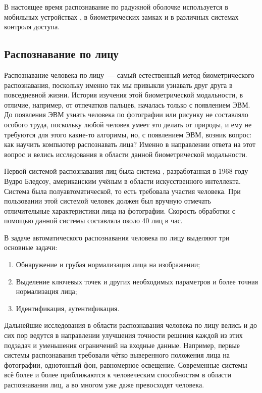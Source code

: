 \documentclass[14pt, a4paper]{extarticle}
\begin{document}
В настоящее время распознавание по радужной оболочке используется в мобильных устройствах \cite{odinokikh2018high}, в биометрических замках и в различных системах контроля доступа.

\subsection{Распознавание по лицу}
Распознавание человека по лицу~--- самый естественный метод биометрического распознавания, поскольку именно так мы привыкли узнавать друг друга в повседневной жизни. История изучения этой биометрической модальности, в отличие, например, от отпечатков пальцев, началась только с появлением ЭВМ. До появления ЭВМ узнать человека по фотографии или рисунку не составляло особого труда, поскольку любой человек умеет это делать от природы, и ему не требуются для этого какие-то алгоримы, но, с появлением ЭВМ, возник вопрос: как научить компьютер распознавать лица? Именно в направлении ответа на этот вопрос и велись исследования в области данной биометрической модальности.

Первой системой распознавания лиц была система \cite{bledsoe1968face}, разработанная в 1968 году Вудро Бледсоу, американским учёным в области искусственного интеллекта. Система была полуавтоматической, то есть требовала участия человека. При пользовании этой системой человек должен был вручную отмечать отличительные характеристики лица на фотографии. Скорость обработки с помощью данной системы составляла около 40 лиц в час.

В задаче автоматического распознавания человека по лицу выделяют три основные задачи:
\begin{enumerate}
	\item Обнаружение и грубая нормализация лица на изображении;
	\item Выделение ключевых точек и других необходимых параметров и более точная нормализация лица;
	\item Идентификация, аутентификация.
\end{enumerate}

Дальнейшие исследования в области распознавания человека по лицу велись и до сих пор ведутся в направлении улучшения точности решения каждой из этих подзадач и уменьшения ограничений на входные данные. Например, первые системы распознавания требовали чётко выверенного положения лица на фотографии, однотонный фон, равномерное освещение. Современные системы всё более и более приближаются к человеческим способностям в области распознавания лиц, а во многом уже даже превосходят человека.
\end{document}
